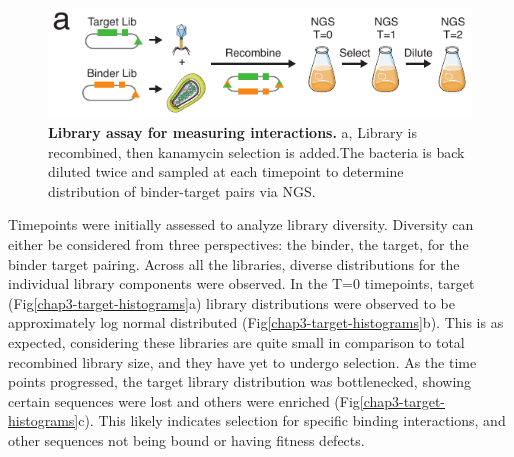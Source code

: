 \begin{figure}[t]
\includegraphics[width=\textwidth]{figures/chapter3/20190621_fig3_selection_description.pdf}
\caption[Library assay for measuring interactions]{\textbf{Library assay for measuring interactions.}
a, Library is recombined, then kanamycin selection is added.The bacteria is back diluted twice and sampled at each timepoint to determine distribution of binder-target pairs via NGS.
\label{chap3-lib-assay}}
\end{figure}

Timepoints were initially assessed to analyze library diversity. Diversity can either be considered from three perspectives: the binder, the target, for the binder target pairing. Across all the libraries, diverse distributions for the individual library components were observed. In the T=0 timepoints, target (Fig\ref{chap3-target-histograms}a) library distributions were observed to be approximately log normal distributed (Fig\ref{chap3-target-histograms}b). This is as expected, considering these libraries are quite small in comparison to total recombined library size, and they have yet to undergo selection. As the time points progressed, the target library distribution was bottlenecked, showing certain sequences were lost and others were enriched (Fig\ref{chap3-target-histograms}c). This likely indicates selection for specific binding interactions, and other sequences not being bound or having fitness defects. 

